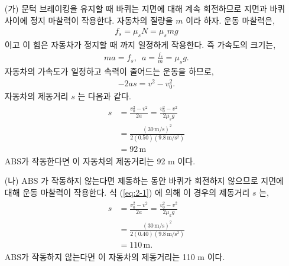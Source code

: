 \documentclass[floatfix,nofootinbib,superscriptaddress,fleqn,preprint]{revtex4}
\begin{document}
\begin{itemize}
  \item[(가)] 문턱 브레이킹을 유지할 때 바퀴는 지면에 대해 계속 회전하므로 지면과 
  바퀴 사이에 정지 마찰력이 작용한다. 자동차의 질량을 $m$ 이라 하자. 운동 마찰력은,
  \begin{align}
    f_s = \mu_s N = \mu_s mg
  \end{align} 
이고 이 힘은 자동차가 정지할 때 까지 일정하게 작용한다. 즉 가속도의 크기는,
\begin{align}
  ma = f_s,\,\,\, a = \frac{f_s}{m}=\mu_s g.
\end{align}
자동차의 가속도가 일정하고 속력이 줄어드는 운동을 하므로,
\begin{align}
  -2as = v^2-v^2_0.
\end{align}
자동차의 제동거리 $s$ 는 다음과 같다.
\begin{align}
  \begin{split}\label{eq:2-1}
    s &= \frac{v^2_0-v^2}{2a} = \frac{v^2_0-v^2}{2\mu_s g}  \\
    &= \frac{(30\,\mathrm{m/s})^2}{2(0.50)(9.8\,\mathrm{m/s^2})}  \\
    &= 92\,\mathrm{m}
  \end{split}
\end{align}
ABS가 작동한다면 이 자동차의 제동거리는 92 m 이다.
  \item[(나)] ABS 가 작동하지 않는다면 제동하는 동안 바퀴가 회전하지 않으므로 
  지면에 대해 운동 마찰력이 작용한다. 식 (\ref{eq:2-1}) 에 의해 이 경우의 
  제동거리 $s$ 는,
  \begin{align}
    \begin{split}
      s &= \frac{v^2_0-v^2}{2a} = \frac{v^2_0-v^2}{2\mu_k g}  \\
      &= \frac{(30\,\mathrm{m/s})^2}{2(0.40)(9.8\,\mathrm{m/s^2})}  \\
      &= 110\,\mathrm{m}.
    \end{split}
  \end{align}
  ABS가 작동하지 않는다면 이 자동차의 제동거리는 110 m 이다.
\end{itemize}

\vspace{1.cm}
\end{document}
